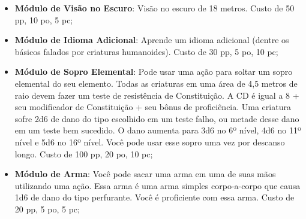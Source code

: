 \begin{multicols}{2}
\begin{itemize}
    \item \textbf{Módulo de Visão no Escuro}: Visão no escuro de 18 metros.
        Custo de 50 pp, 10 po, 5 pc;
    \item \textbf{Módulo de Idioma Adicional}: Aprende um idioma adicional
        (dentre os básicos falados por criaturas humanoides). Custo de 30 pp, 5
        po, 10 pc;
    \item \textbf{Módulo de Sopro Elemental}: Pode usar uma ação para soltar um
        sopro elemental do seu elemento. Todas as criaturas em uma área de 4,5
        metros de raio devem fazer um teste de resistência de Constituição. A CD
        é igual a 8 + seu modificador de Constituição + seu bônus de
        proficiência. Uma criatura sofre 2d6 de dano do tipo escolhido em um
        teste falho, ou metade desse dano em um teste bem sucedido. O dano
        aumenta para 3d6 no 6º nível, 4d6 no 11º nível e 5d6 no 16º nível. Você
        pode usar esse sopro uma vez por descanso longo. Custo de 100 pp, 20 po,
        10 pc;
    \item \textbf{Módulo de Arma}: Você pode sacar uma arma em uma de suas
        mãos utilizando uma ação. Essa arma é uma arma simples corpo-a-corpo que
        causa 1d6 de dano do tipo perfurante. Você é proficiente com essa arma.
        Custo de 20 pp, 5 po, 5 pc;
\end{itemize}



\end{multicols}

